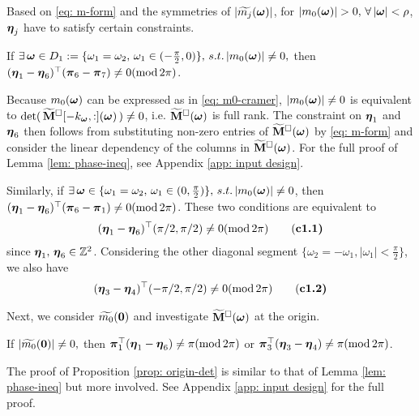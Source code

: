 Based on \eqref{eq: m-form} and the symmetries of $|\widetilde{m_{j}}(\boldsymbol{\omega})|$, for $|m_0(\boldsymbol{\omega})| > 0,\, \forall\, |\boldsymbol{\omega}| < \rho$, $\boldsymbol{\eta}_j$ have to satisfy certain constraints.
 
\begin{lemma}\label{lem: phase-ineq}
If $\exists\,\boldsymbol{\omega}\in D_1:=\{\omega_1=\omega_2,\,\omega_1\in(-\frac{\pi}{2},0)\},\,s.t. \,|m_0(\boldsymbol{\omega})|\neq 0,$ then $(\boldsymbol{\eta}_1-\boldsymbol{\eta}_6)^\top (\boldsymbol{\pi}_6-\boldsymbol{\pi}_7)\neq 0(\text{mod}\,2\pi)$. 
\end{lemma} 

Because $m_0(\boldsymbol{\omega})$ can be expressed as in \eqref{eq: m0-cramer}, $|m_0(\boldsymbol{\omega})|\neq 0$ is equivalent to $\det(\,\widetilde{\mathbf{M}}^{\Box}[-k_{\boldsymbol{\omega}},:](\boldsymbol{\omega})\,)\neq 0$, i.e. $\widetilde{\mathbf{M}}^{\Box}(\boldsymbol{\omega})$ is full rank. The constraint on $\boldsymbol{\eta}_1$ and $\boldsymbol{\eta}_6$ then follows from substituting non-zero entries of $\widetilde{\mathbf{M}}^{\Box}(\boldsymbol{\omega})$ by \eqref{eq: m-form} and consider the linear dependency of the columns in $\widetilde{\mathbf{M}}^{\Box}(\boldsymbol{\omega})$. For the full proof of Lemma \ref{lem: phase-ineq}, see Appendix \ref{app: input design}.

Similarly, if $\exists\,\boldsymbol{\omega}\in \{\omega_1 = \omega_2,\, \omega_1\in(0,\frac{\pi}{2})\},\, s.t.\, |m_0(\boldsymbol{\omega})| \neq 0$, then $(\boldsymbol{\eta}_1-\boldsymbol{\eta}_6)^\top (\boldsymbol{\pi}_6-\boldsymbol{\pi}_1)\neq 0(\text{mod}\,2\pi)$. These two conditions are equivalent to 
\begin{align*}
(\boldsymbol{\eta}_1-\boldsymbol{\eta}_6)^\top(\pi/2,\pi/2)\neq 0 (\text{mod}\,2\pi)\tag{\bf c1.1}
\end{align*}
since $\boldsymbol{\eta}_1,\,\boldsymbol{\eta}_6\in\mathbb{Z}^2$.
Considering the other diagonal segment $\{\omega_2 = -\omega_1, |\omega_1| <\frac{\pi}{2}\}$, we also have 
\begin{align*}
(\boldsymbol{\eta}_3-\boldsymbol{\eta}_4)^\top(-\pi/2,\pi/2)\neq 0 (\text{mod}\, 2\pi)\tag{\bf c1.2}
\end{align*}

Next, we consider $\widetilde{m_0}(\boldsymbol{0})$ and investigate $\widetilde{\mathbf{M}}^{\Box}(\boldsymbol{\omega})$ at the origin.
\begin{proposition}\label{prop: origin-det}
If $|\widetilde{m_0}(\boldsymbol{0})|\neq 0,$ then $\boldsymbol{\pi}_1^\top(\boldsymbol{\eta}_1-\boldsymbol{\eta}_6)\neq \pi(\text{mod}\,2\pi)$ or $\boldsymbol{\pi}_3^\top(\boldsymbol{\eta}_3-\boldsymbol{\eta}_4)\neq \pi(\text{mod}\,2\pi)$. 
\end{proposition}
The proof of Proposition \ref{prop: origin-det} is similar to that of Lemma \ref{lem: phase-ineq} but more involved. See Appendix \ref{app: input design} for the full proof.

